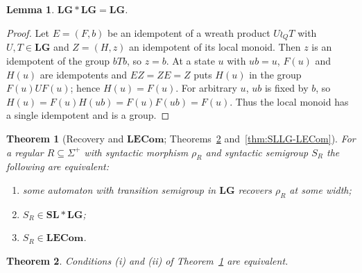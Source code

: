 \documentclass[11pt]{article}
\numberwithin{equation}{section}
\theoremstyle{plain}
\newtheorem{theorem}{Theorem}[section]
\newtheorem{lemma}[theorem]{Lemma}
\theoremstyle{definition}
\theoremstyle{remark}
\theoremstyle{plain}
\newtheorem{mainthm}{Theorem}
\newcommand{\LG}{\mathbf{LG}}
\newcommand{\SL}{\mathbf{SL}}
\newcommand{\LECom}{\mathbf{L}\mathbf{ECom}}
\begin{document}
\begin{lemma}
\label{lem:lg-closed}
$\LG*\LG=\LG$.
\end{lemma}

\begin{proof}
Let $E=(F,b)$ be an idempotent of a wreath product $U\wr_QT$ with $U,T\in\LG$
and $Z=(H,z)$ an idempotent of its local monoid.  Then $z$ is an idempotent of
the group $bTb$, so $z=b$.  At a state $u$ with $ub=u$, $F(u)$ and $H(u)$ are
idempotents and $EZ=ZE=Z$ puts $H(u)$ in the group $F(u)UF(u)$; hence
$H(u)=F(u)$.  For arbitrary $u$, $ub$ is fixed by $b$, so
$H(u)=F(u)H(ub)=F(u)F(ub)=F(u)$.  Thus the local monoid has a single
idempotent and is a group.
\end{proof}

\setcounter{mainthm}{2}%
\begin{mainthm}[Recovery and $\LECom$; Theorems~\ref{thm:recovery}
and~\ref{thm:SLLG-LECom}]
\label{thm:C}
For a regular $R\subseteq\Sigma^+$ with syntactic morphism $\rho_R$ and
syntactic semigroup $S_R$ the following are equivalent:
\begin{enumerate}[label=(\roman*),leftmargin=*]
\item some automaton with transition semigroup in $\LG$ recovers $\rho_R$ at
some width;
\item $S_R\in\SL*\LG$;
\item $S_R\in\LECom$.
\end{enumerate}
\end{mainthm}

\begin{theorem}
\label{thm:recovery}
Conditions (i) and (ii) of Theorem~\ref{thm:C} are equivalent.
\end{theorem}
\end{document}
